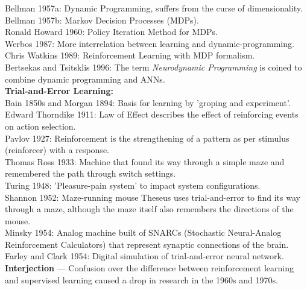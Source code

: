 \documentclass[a4paper]{article}
\begin{document}
Bellman 1957a: Dynamic Programming, suffers from the curse of dimensionality.\\

Bellman 1957b: Markov Decision Processes (MDPs).\\

Ronald Howard 1960: Policy Iteration Method for MDPs.\\

Werbos 1987: More interrelation between learning and dynamic-programming.\\

Chris Watkins 1989: Reinforcement Learning with MDP formalism.\\

Bertsekas and Tsitsklis 1996: The term \textit{Neurodynamic Programming} is coined to combine dynamic programming and ANNs.\\

\textbf{Trial-and-Error Learning:}\\

Bain 1850s and Morgan 1894: Basis for learning by 'groping and experiment'.\\

Edward Thorndike 1911: Law of Effect describes the effect of reinforcing events on action selection.\\

Pavlov 1927: Reinforcement is the strengthening of a pattern as per stimulus (reinforcer) with a response.\\

Thomas Ross 1933: Machine that found its way through a simple maze and remembered the path through switch settings.\\

Turing 1948: 'Pleasure-pain system' to impact system configurations.\\

Shannon 1952: Maze-running mouse Theseus uses trial-and-error to find its way through a maze, although the maze itself also remembers the directions of the mouse.\\

Minsky 1954: Analog machine built of SNARCs (Stochastic Neural-Analog Reinforcement Calculators) that represent synaptic connections of the brain.\\

Farley and Clark 1954: Digital simulation of trial-and-error neural network.\\

\textbf{Interjection} --- Confusion over the difference between reinforcement learning and supervised learning caused a drop in research in the 1960s and 1970s.\\
\end{document}
